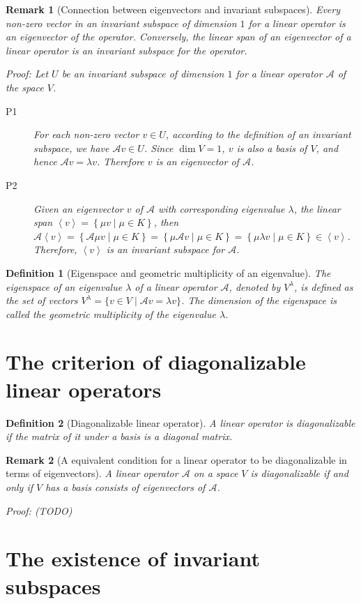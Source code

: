 \documentclass[onecolumn]{ctexart}
\newtheorem{definition}{Definition}
\newtheorem{remark}{Remark}
\begin{document}
\begin{remark}[Connection between eigenvectors and invariant subspaces]
  Every non-zero vector in an invariant subspace of dimension $1$ for a linear 
  operator is an eigenvector of the operator. Conversely, the linear span of an 
  eigenvector of a linear operator is an invariant subspace for the operator.

  Proof: Let $U$ be an invariant subspace of dimension $1$ for a linear operator $\mathcal{A}$ of the space $V$.
  \begin{description}
    \item[P1] For each non-zero vector $v \in U$, according to the definition of 
    an invariant subspace, we have $\mathcal{A}v \in U$. Since $\dim V = 1$, $v$ 
    is also a basis of $V$, and hence $\mathcal{A}v = \lambda v$. Therefore $v$ 
    is an eigenvector of $\mathcal{A}$.
    \item[P2] Given an eigenvector $v$ of $\mathcal{A}$ with corresponding 
    eigenvalue $\lambda$, the linear span $\left\langle v \right\rangle = \left\{ 
    \mu v \mid \mu \in K \right\}$, then $\mathcal{A}\left\langle v \right\rangle 
    = \left\{ \mathcal{A} \mu v \mid \mu \in K\right\} = \left\{ \mu \mathcal{A} 
    v \mid \mu \in K\right\} =  \left\{ \mu \lambda v \mid \mu \in K\right\} \in 
    \left\langle v \right\rangle$. Therefore, $\left\langle v \right\rangle$ is 
    an invariant subspace for $\mathcal{A}$.
  \end{description}
\end{remark}

\begin{definition}[Eigenspace and geometric multiplicity of an eigenvalue]
  The eigenspace of an eigenvalue $\lambda$ of a linear operator $\mathcal{A}$, 
  denoted by $V^{\lambda}$, is defined as the set of vectors $V^{\lambda} = \lbrace 
  v \in V \mid \mathcal{A}v = \lambda v \rbrace$. The dimension of the eigenspace 
  is called the geometric multiplicity of the eigenvalue $\lambda$.
\end{definition}

\section{The criterion of diagonalizable linear operators}

\begin{definition}[Diagonalizable linear operator]
  A linear operator is diagonalizable if the matrix of it under a basis is a diagonal matrix.
\end{definition}
\begin{remark}[A equivalent condition for a linear operator to be diagonalizable in terms of eigenvectors]
  A linear operator $\mathcal{A}$ on a space $V$ is diagonalizable if and only 
  if $V$ has a basis consists of eigenvectors of $\mathcal{A}$.

  Proof: (TODO)
\end{remark}

\section{The existence of invariant subspaces}
\end{document}
